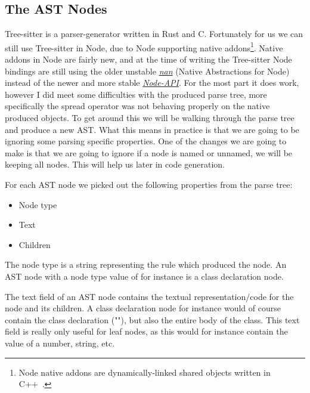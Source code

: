 
\subsection{The AST Nodes}\label{subsec:the-ast-nodes}

Tree-sitter is a parser-generator written in Rust and C.
Fortunately for us we can still use Tree-sitter in Node, due to Node supporting native addons\footnote{Node native addons are dynamically-linked shared objects written in C++~\cite{nodenativeaddons}.}.
Native addons in Node are fairly new, and at the time of writing the Tree-sitter Node bindings are still using the older unstable \textit{\hyperref[https://github.com/nodejs/nan]{nan}} (Native Abstractions for Node) instead of the newer and more stable \textit{\hyperref[https://nodejs.org/api/n-api.html]{Node-API}}.
For the most part it does work, however I did meet some difficulties with the produced parse tree, more specifically the spread operator was not behaving properly on the native produced objects.
To get around this we will be walking through the parse tree and produce a new AST\@.
What this means in practice is that we are going to be ignoring some parsing specific properties.
One of the changes we are going to make is that we are going to ignore if a node is named or unnamed, we will be keeping all nodes.
This will help us later in code generation.

For each AST node we picked out the following properties from the parse tree:

\begin{itemize}
    \item Node type
    \item Text
    \item Children
\end{itemize}

The node type is a string representing the rule which produced the node.
An AST node with a node type value of  for instance is a class declaration node.

The text field of an AST node contains the textual representation/code for the node and its children.
A class declaration node for instance would of course contain the class declaration (""), but also the entire body of the class.
This text field is really only useful for leaf nodes, as this would for instance contain the value of a number, string, etc.

